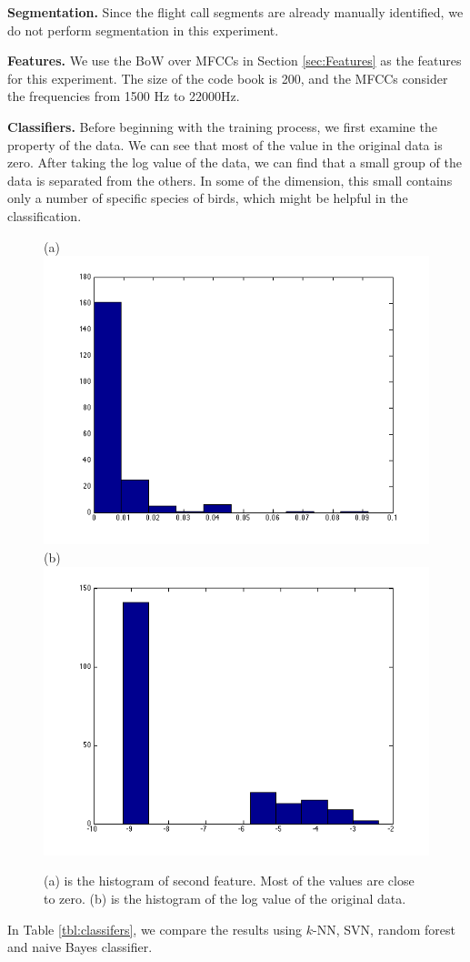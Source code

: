 \documentclass[12pt,peerreview,letterpaper]{IEEEtran}
\begin{document}
\textbf{Segmentation.}
Since the flight call segments are already manually identified, we do not perform segmentation in this experiment.

\textbf{Features.}
We use the BoW over MFCCs in Section \ref{sec:Features} as the features for this experiment. The size of the code book is 200, and the MFCCs consider the frequencies from 1500 Hz to 22000Hz.

\textbf{Classifiers.}
Before beginning with the training process, we first examine the property of the data. We can see that most of the value in the original data is zero. After taking the log value of the data, we can find that a small group of the data is separated from the others. In some of the dimension, this small contains only a number of specific species of birds, which might be helpful in the classification.

\begin{figure}[b!]
    \centering
    {(a)\includegraphics[width=0.38\linewidth]{../Figure/Train_features}
    (b)\includegraphics[width=0.38\linewidth]{../Figure/Train_features_log}}
    \caption{(a) is the histogram of second feature. Most of the values are close to zero. (b) is the histogram of the log value of the original data.}
    \label{fig:hist}
\end{figure}


In Table \ref{tbl:classifers}, we compare the results using $k$-NN, SVN, random forest and naive Bayes classifier.
\end{document}
